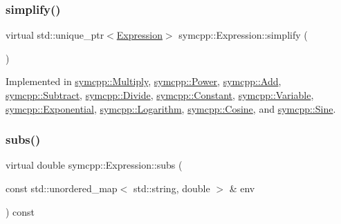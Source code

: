 \mbox{\label{classsymcpp_1_1Expression_ab1fa6e55eea0682250d013f28db26cd2}} 
\subsubsection{\texorpdfstring{simplify()}{simplify()}}
{\footnotesize\ttfamily virtual std\+::unique\+\_\+ptr$<$\mbox{\hyperlink{classsymcpp_1_1Expression}{Expression}}$>$ symcpp\+::\+Expression\+::simplify (\begin{DoxyParamCaption}{ }\end{DoxyParamCaption})\hspace{0.3cm}{\ttfamily [pure virtual]}}



Implemented in \mbox{\hyperlink{classsymcpp_1_1Multiply_aff728e2edaa447f154918079b4e35a7e}{symcpp\+::\+Multiply}}, \mbox{\hyperlink{classsymcpp_1_1Power_aa6411b410decc9778640feaa7d173349}{symcpp\+::\+Power}}, \mbox{\hyperlink{classsymcpp_1_1Add_a5a68fdd76c2206399dd5a78c4b317505}{symcpp\+::\+Add}}, \mbox{\hyperlink{classsymcpp_1_1Subtract_a3d3b5586c41dbbee1071a08db5725ecc}{symcpp\+::\+Subtract}}, \mbox{\hyperlink{classsymcpp_1_1Divide_ab0e372a337f207a3e4c78fd1db9351a7}{symcpp\+::\+Divide}}, \mbox{\hyperlink{classsymcpp_1_1Constant_a082044c6d521c2d31bbadd5db6354f96}{symcpp\+::\+Constant}}, \mbox{\hyperlink{classsymcpp_1_1Variable_afd613d28c73d738fc0cf90b70e1820bb}{symcpp\+::\+Variable}}, \mbox{\hyperlink{classsymcpp_1_1Exponential_a099298ffa8721a8bb646d98518542d24}{symcpp\+::\+Exponential}}, \mbox{\hyperlink{classsymcpp_1_1Logarithm_af771894e90cbe561e3eb2e9a9b32954b}{symcpp\+::\+Logarithm}}, \mbox{\hyperlink{classsymcpp_1_1Cosine_a8bedd5e4ad3245d5ee6e6e7da3b5e8dc}{symcpp\+::\+Cosine}}, and \mbox{\hyperlink{classsymcpp_1_1Sine_a3cac7091905da6765a019a0ece9e45d5}{symcpp\+::\+Sine}}.

\mbox{\label{classsymcpp_1_1Expression_aaef29b0afa2d6c21fe35f47a1be76134}} 
\subsubsection{\texorpdfstring{subs()}{subs()}}
{\footnotesize\ttfamily virtual double symcpp\+::\+Expression\+::subs (\begin{DoxyParamCaption}\item[{const std\+::unordered\+\_\+map$<$ std\+::string, double $>$ \&}]{env }\end{DoxyParamCaption}) const\hspace{0.3cm}{\ttfamily [pure virtual]}}



